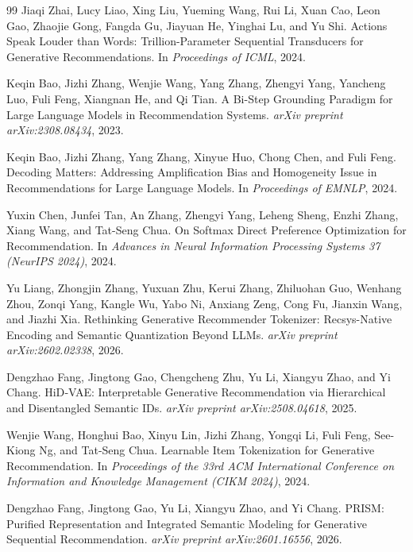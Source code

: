 \documentclass[11pt]{article}
\begin{document}
\begin{thebibliography}{99}
Jiaqi Zhai, Lucy Liao, Xing Liu, Yueming Wang, Rui Li, Xuan Cao, Leon Gao, Zhaojie Gong, Fangda Gu, Jiayuan He, Yinghai Lu, and Yu Shi.
Actions Speak Louder than Words: Trillion-Parameter Sequential Transducers for Generative Recommendations.
In \textit{Proceedings of ICML}, 2024.

Keqin Bao, Jizhi Zhang, Wenjie Wang, Yang Zhang, Zhengyi Yang, Yancheng Luo, Fuli Feng, Xiangnan He, and Qi Tian.
A Bi-Step Grounding Paradigm for Large Language Models in Recommendation Systems.
\textit{arXiv preprint arXiv:2308.08434}, 2023.

Keqin Bao, Jizhi Zhang, Yang Zhang, Xinyue Huo, Chong Chen, and Fuli Feng.
Decoding Matters: Addressing Amplification Bias and Homogeneity Issue in Recommendations for Large Language Models.
In \textit{Proceedings of EMNLP}, 2024.

Yuxin Chen, Junfei Tan, An Zhang, Zhengyi Yang, Leheng Sheng, Enzhi Zhang, Xiang Wang, and Tat-Seng Chua.
On Softmax Direct Preference Optimization for Recommendation.
In \textit{Advances in Neural Information Processing Systems 37 (NeurIPS 2024)}, 2024.

Yu Liang, Zhongjin Zhang, Yuxuan Zhu, Kerui Zhang, Zhiluohan Guo, Wenhang Zhou, Zonqi Yang, Kangle Wu, Yabo Ni, Anxiang Zeng, Cong Fu, Jianxin Wang, and Jiazhi Xia.
Rethinking Generative Recommender Tokenizer: Recsys-Native Encoding and Semantic Quantization Beyond LLMs.
\textit{arXiv preprint arXiv:2602.02338}, 2026.

Dengzhao Fang, Jingtong Gao, Chengcheng Zhu, Yu Li, Xiangyu Zhao, and Yi Chang.
HiD‑VAE: Interpretable Generative Recommendation via Hierarchical and Disentangled Semantic IDs.
\textit{arXiv preprint arXiv:2508.04618}, 2025.

Wenjie Wang, Honghui Bao, Xinyu Lin, Jizhi Zhang, Yongqi Li, Fuli Feng, See-Kiong Ng, and Tat-Seng Chua.
Learnable Item Tokenization for Generative Recommendation.
In \textit{Proceedings of the 33rd ACM International Conference on Information and Knowledge Management (CIKM 2024)}, 2024.

Dengzhao Fang, Jingtong Gao, Yu Li, Xiangyu Zhao, and Yi Chang.
PRISM: Purified Representation and Integrated Semantic Modeling for Generative Sequential Recommendation.
\textit{arXiv preprint arXiv:2601.16556}, 2026.

\end{thebibliography}
\end{document}
